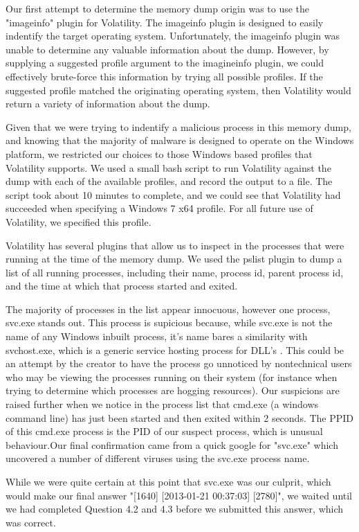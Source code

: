 Our first attempt to determine the memory dump origin was to use the "imageinfo" plugin for Volatility. The imageinfo plugin is designed to easily indentify the target operating system. Unfortunately, the imageinfo plugin was unable to determine any valuable information about the dump. However, by supplying a suggested profile argument to the imagineinfo plugin, we could effectively brute-force this information by trying all possible profiles. If the suggested profile matched the originating operating system, then Volatility would return a variety of information about the dump. 

Given that we were trying to indentify a malicious process in this memory dump, and knowing that the majority of malware is designed to operate on the Windows platform, we restricted our choices to those Windows based profiles that Volatility supports. We used a small bash script to run Volatility against the dump with each of the available profiles, and record the output to a file.
The script took about 10 minutes to complete, and we could see that Volatility had succeeded when specifying a Windows 7 x64 profile. For all future use of Volatility, we specified this profile.

Volatility has several plugins that allow us to inspect in the processes that were running at the time of the memory dump. We used the pslist plugin to dump a list of all running processes, including their name, process id, parent process id, and the time at which that process started and exited. 

The majority of processes in the list appear innocuous, however one process, svc.exe stands out. This process is supicious because, while svc.exe is not the name of any Windows inbuilt process, it's name bares a similarity with svchost.exe, which is a generic service hosting process for DLL's \cite[p11]{winint}. This could be an attempt by the creator to have the process go unnoticed by nontechnical users who may be viewing the processes running on their system (for instance when trying to determine which processes are hogging resources). Our suspicions are raised further when we notice in the process list that cmd.exe (a windows command line) has just been started and then exited within 2 seconds. The PPID of this cmd.exe process is the PID of our suspect process, which is unusual behaviour.Our final confirmation came from a quick google for "svc.exe" which uncovered a number of different viruses using the svc.exe process name.

While we were quite certain at this point that svc.exe was our culprit, which would make our final answer "[1640] [2013-01-21 00:37:03] [2780]", we waited until we had completed Question 4.2 and 4.3 before we submitted this answer, which was correct.


